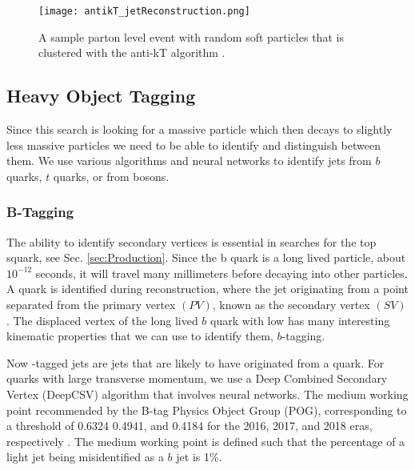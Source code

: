 \begin{figure}
 	\centering
	\texttt{[image: antikT\_jetReconstruction.png]}
 	\caption[Anti-$k_T$ Jet Reconstruction]{A sample parton level event with random soft particles that is clustered with the anti-kT algorithm \cite{cacciari_anti-ktjet_2008}.}
 	\label{antikTJetReco} 
\end{figure}

\subsection{Heavy Object Tagging}\label{HeavyObject}
Since this search is looking for a massive particle which then decays to slightly less massive particles we need to be able to identify and distinguish between them. We use various algorithms and neural networks to identify jets from $b$ quarks, $t$ quarks, or from \W {} bosons. 

\subsubsection{B-Tagging}\label{Btagging}
The ability to identify secondary vertices is essential in searches for the top squark, see Sec. \ref{sec:Production}. Since the b quark is a long lived particle, about $10^{-12}$ seconds, it will travel many millimeters before decaying into other particles. A \B{} quark is identified during reconstruction, where the jet originating from a point separated from the primary vertex $(PV)$, known as the secondary vertex $(SV)$. The displaced vertex of the long lived $b$ quark with low \pt{} has many interesting kinematic properties that we can use to identify them, $b$-tagging. 

Now \B-tagged jets are jets that are likely to have originated from a \B{} quark. For \B{} quarks with large transverse momentum, we use a Deep Combined Secondary Vertex (DeepCSV) algorithm that involves neural networks\cite{noauthor_performance_nodate}. The medium working point recommended by the B-tag Physics Object Group (POG), corresponding to a threshold of 0.6324 0.4941, and 0.4184 for the 2016, 2017, and 2018 eras, respectively \cite{noauthor_https://twiki.cern.ch/twiki/bin/viewauth/cms/btagrecommendation2016legacy_nodate, noauthor_https://twiki.cern.ch/twiki/bin/viewauth/cms/btagrecommendation94x_nodate, noauthor_https://twiki.cern.ch/twiki/bin/viewauth/cms/btagrecommendation102x_nodate, noauthor_https://twiki.cern.ch/twiki/bin/viewauth/cms/btagsfmethods_nodate}. The medium working point is defined such that the percentage of a light jet being misidentified as a $b$ jet is 1\%.

